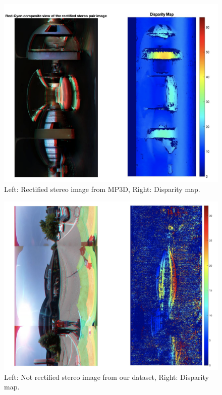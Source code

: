 \documentclass[english, LaM, oneside]{sapthesis}%
\begin{document}


\begin{figure}[h] %
    \centering
    \includegraphics[width=\linewidth]{Images/mp3d_disp2.png}
    \caption{Left: Rectified stereo image from MP3D, Right: Disparity map.}
    \label{fig:mp3d_disp}
\end{figure}

\newpage

\begin{figure}[h] %
    \centering
    \includegraphics[width=\linewidth]{Images/ours_disp2.png}
    \caption{Left: Not rectified stereo image from our dataset, Right: Disparity map.}
    \label{fig:ours}
\end{figure}
\end{document}
